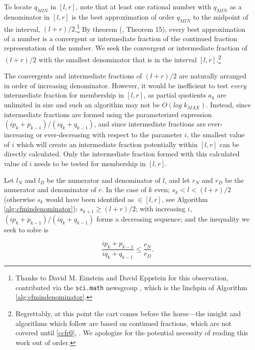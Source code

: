 To locate $q_{MIN}$ in $[l,r]$, note that at least one rational number
with $q_{MIN}$ as a denominator in $[l,r]$ is the best approximation
of order $q_{MIN}$ to the midpoint of the interval,
$(l+r)/2$.\footnote{Thanks to David M. Einstein \cite{bibref:i:davidmeinstein} 
and David Eppstein \cite{bibref:i:davideppstein}
for this observation, contributed via the \texttt{sci.math} newsgroup
\cite{bibref:n:scimathnewsgroup},
which is the linchpin of Algorithm \ref{alg:cfmindenominator}.}
By theorem (\cite{bibref:b:KhinchinClassic}, Theorem 15), every best approximation
of a number is a convergent or intermediate fraction of the
continued fraction representation of the number.  We seek the
convergent or intermediate fraction of $(l+r)/2$ with the smallest
denominator that is in the interval $[l,r]$.\footnote{Regrettably,
at this point the cart comes before the horse---the insight and
algorithms which follow are based on continued fractions, which
are not covered until \ccfrzeroxrefcomma{}\ccfrzeromcclass{} \ref{ccfr0}, 
\emph{\ccfrzeroshorttitle{}}.  We apologize for the potential necessity
of reading this work out of order.}

The convergents and intermediate fractions of $(l+r)/2$ are naturally
arranged in order of increasing denominator.  However, it would be
inefficient to test \emph{every} intermediate fraction
for membership in $[l,r]$, as partial quotients $a_k$ are unlimited in
size and such an algorithm may not be $O(log \; k_{MAX})$.  Instead,
since intermediate fractions are formed using the parameterized
expression $(i p_k + p_{k-1})/(i q_k + q_{k-1})$,
and since intermediate fractions are ever-increasing
or ever-decreasing with respect to the parameter $i$, the
smallest value of $i$ which will create an intermediate
fraction potentially within $[l,r]$ can be directly
calculated.  Only the intermediate fraction formed with
this calculated value of $i$ needs to be tested for membership in
$[l,r]$.

Let $l_N$ and $l_D$ be the numerator and denominator of $l$, and
let $r_N$ and $r_D$ be the numerator and denominator of $r$.
In the case of $k$ even; $s_k < l < (l+r)/2$ (otherwise $s_k$
would have been identified as $\in [l,r]$, see Algorithm
\ref{alg:cfmindenominator}); $s_{k+1} \geq (l+r)/2$;
with increasing $i$, $(i p_k + p_{k-1})/(i q_k + q_{k-1})$
forms a decreasing sequence; and the inequality we seek to solve is

\begin{equation}
\label{eq:cfry0:schk0:ifselection01}
\frac{i p_k + p_{k-1}}{i q_k + q_{k-1}} \leq \frac{r_N}{r_D}.
\end{equation}

